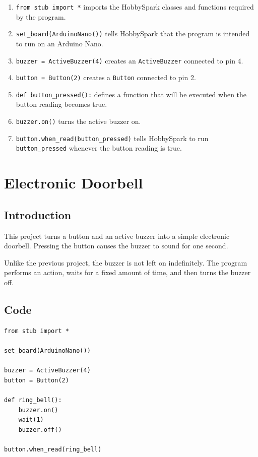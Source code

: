 \begin{enumerate}
    \item \texttt{from stub import *} imports the HobbySpark classes and
    functions required by the program.

    \item \texttt{set\_board(ArduinoNano())} tells HobbySpark that the program
    is intended to run on an Arduino Nano.

    \item \texttt{buzzer = ActiveBuzzer(4)} creates an
    \texttt{ActiveBuzzer} connected to pin 4.

    \item \texttt{button = Button(2)} creates a \texttt{Button} connected to
    pin 2.

    \item \texttt{def button\_pressed():} defines a function that will be
    executed when the button reading becomes true.

    \item \texttt{buzzer.on()} turns the active buzzer on.

    \item \texttt{button.when\_read(button\_pressed)} tells HobbySpark to run
    \texttt{button\_pressed} whenever the button reading is true.
\end{enumerate}


\newpage

\section{Electronic Doorbell}

\subsection{Introduction}

This project turns a button and an active buzzer into a simple electronic
doorbell. Pressing the button causes the buzzer to sound for one second.

Unlike the previous project, the buzzer is not left on indefinitely. The
program performs an action, waits for a fixed amount of time, and then turns
the buzzer off.

\subsection{Code}

\begin{lstlisting}
from stub import *

set_board(ArduinoNano())

buzzer = ActiveBuzzer(4)
button = Button(2)

def ring_bell():
    buzzer.on()
    wait(1)
    buzzer.off()

button.when_read(ring_bell)
\end{lstlisting}

